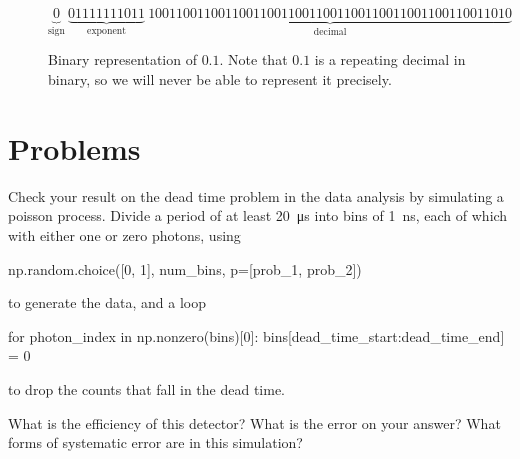 \documentclass[justified, nobib]{tufte-handout}
\newcommand{\matplotlibGalleryLink}{http://matplotlib.org/gallery.html}
\newcommand{\matplotlibGalleryNote}{\footnote{You will need the syntax for
      matplotlib. You can find everything with the help commands, or can get
      syntax and ideas from \href{\matplotlibGalleryLink}{example plots} that
      others have made.}}
\begin{document}
\begin{figure}[hb]
\small
$$\underbrace{0}_{\text{sign}} \: \underbrace{01111111011}_{\text{exponent}} \: \underbrace{1001100110011001100110011001100110011001100110011010}_{\text{decimal}}$$
\caption{Binary representation of $0.1$. Note that $0.1$ is a repeating decimal in binary, so we will never be able to represent it precisely.}
\end{figure}
\pagebreak

\section*{Problems}


\noindent
Check your result on the dead time problem in the data analysis by simulating a poisson process. Divide a period of at least \SI{20}{\micro\second} into bins of \SI{1}{\nano\second}, each of which with either one or zero photons, using
\begin{pythoncode}
        np.random.choice([0, 1], num_bins, p=[prob_1, prob_2])
\end{pythoncode}
to generate the data, and a loop
\begin{pythoncode}
        for photon_index in np.nonzero(bins)[0]:
            bins[dead_time_start:dead_time_end] = 0
\end{pythoncode}
to drop the counts that fall in the dead time.

\noindent
What is the efficiency of this detector?
What is the error on your answer?
What forms of systematic error are in this simulation?


\end{document}

